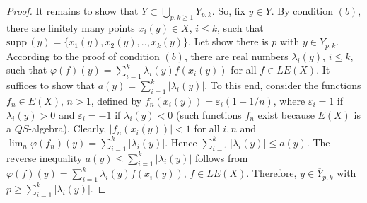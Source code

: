 \documentclass[12pt]{amsart}
\def\supp{{\mathrm {supp}}\,}
\begin{document}
\begin{proof}
It remains to show that $Y\subset\bigcup_{p,k\geq 1}\overline Y_{p,k}$. So, fix $y\in Y$. By condition $(b)$, there are finitely many points $x_i(y)\in X$, $i\leq k$, such that $\supp(y)=\{x_1(y),x_2(y),..,x_k(y)\}$.
Let show there is $p$ with $y\in\overline Y_{p,k}$. According to the proof of condition $(b)$, there are real numbers $\lambda_i(y)$, $i\leq k$, such that
$\varphi(f)(y)=\sum_{i=1}^k\lambda_i(y)f(x_i(y))$ for all $f\in LE(X)$.
It suffices to show that $a(y)=\sum_{i=1}^k|\lambda_i(y)|$. To this end, consider the functions $f_n\in E(X)$, $n>1$, defined by $f_n(x_i(y))=\varepsilon_i(1-1/n)$, where 
$\varepsilon_i=1$ if $\lambda_i(y)>0$ and $\varepsilon_i=-1$ if $\lambda_i(y)<0$ (such functions $f_n$ exist because $E(X)$ is a $QS$-algebra). Clearly, $|f_n(x_i(y))|<1$ for all $i,n$ and 
$\lim_n\varphi(f_n)(y)=\sum_{i=1}^k|\lambda_i(y)|$. Hence $\sum_{i=1}^k|\lambda_i(y)|\leq a(y)$. The reverse inequality $a(y)\leq \sum_{i=1}^k|\lambda_i(y)|$ follows from $\varphi(f)(y)=\sum_{i=1}^k\lambda_i(y)f(x_i(y))$, $f\in LE(X)$. Therefore, $y\in\overline Y_{p,k}$ with $p\geq\sum_{i=1}^k|\lambda_i(y)|$.  


\end{proof}
\end{document}
